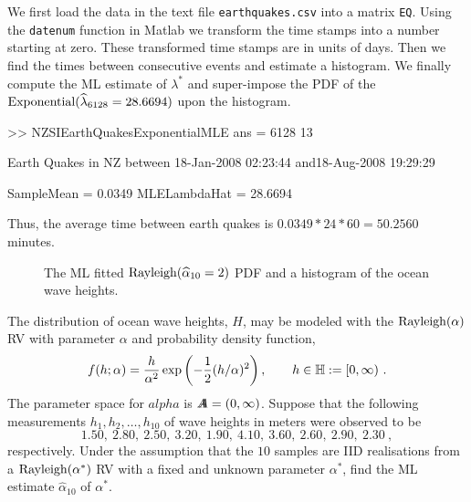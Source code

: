{\begin{labwork}
We first load the data in the text file {\tt earthquakes.csv} into a matrix {\tt EQ}.  Using the {\tt datenum} function in {\sc Matlab} we transform the time stamps into a number starting at zero.  These transformed time stamps are in units of days.  Then we find the times between consecutive events and estimate a histogram.  We finally compute the ML estimate of $\lambda^*$ and super-impose the PDF of the $\mbox{{\rm Exponential}}(\widehat{\lambda}_{6128}= 28.6694)$ upon the histogram.
\begin{VrbM}
>> NZSIEarthQuakesExponentialMLE
ans =        6128          13

Earth Quakes in NZ between
18-Jan-2008 02:23:44 and18-Aug-2008 19:29:29

SampleMean =    0.0349
MLELambdaHat =   28.6694
\end{VrbM}
Thus, the average time between earth quakes is $0.0349*24*60=50.2560$ minutes.
\end{labwork}

\begin{figure}[htpb]
\caption{The ML fitted ${\rm Rayleigh}(\widehat{\alpha}_{10}= 2)$ PDF and a histogram of the ocean wave heights.\label{F:RayleighOceanHeightsMLE}}
\centering   {}
\end{figure}
\begin{labwork}\label{LW:RayleighOceanHeightsMLE}
The distribution of ocean wave heights, $H$, may be modeled with the ${\rm Rayleigh}(\alpha)$ RV with parameter $\alpha$ and probability density function,
\[
f(h;\alpha) = \frac{h}{\alpha^2} \exp \left({-\frac{1}{2} (h/\alpha)^2}\right), \qquad h \in \mathbb{H} := [0,\infty) \ .
\]
The parameter space for $alpha$ is ${A}\mspace{-11 mu}{A} = (0,\infty)$.  Suppose that the following measurements $h_1,h_2,\ldots,h_{10}$ of wave heights in meters were observed to be
\[
1.50, \  2.80, \ 2.50, \ 3.20, \ 1.90, \ 4.10, \ 3.60, \ 2.60, \ 2.90, \ 2.30 \ ,
\]
respectively.  Under the assumption that the $10$ samples are IID realisations from a ${\rm Rayleigh}(\alpha^*)$ RV with a fixed and unknown parameter $\alpha^*$, find the ML estimate $\widehat{\alpha}_{10}$ of $\alpha^*$.


\end{labwork}}
